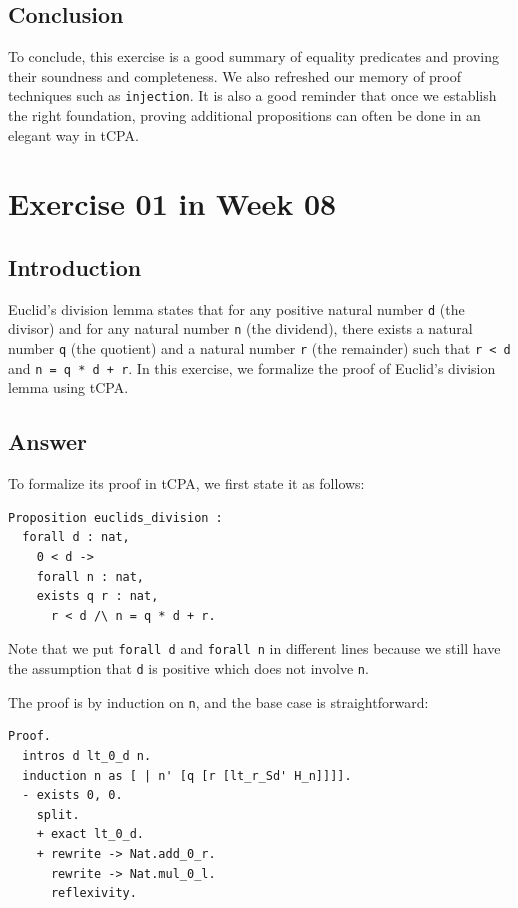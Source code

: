 \documentclass{article}
\begin{document}
\subsection{Conclusion}
To conclude, this exercise is a good summary of equality predicates and proving their soundness and completeness. We also refreshed our memory of proof techniques such as \texttt{injection}. It is also a good reminder that once we establish the right foundation, proving additional propositions can often be done in an elegant way in tCPA.

\newpage

\section{Exercise 01 in Week 08}

\subsection{Introduction}
Euclid's division lemma states that for any positive natural number \texttt{d} (the divisor) and for any natural number \texttt{n} (the dividend), there exists a natural number \texttt{q} (the quotient) and a natural number \texttt{r} (the remainder) such that \texttt{r < d} and \texttt{n = q * d + r}. In this exercise, we formalize the proof of Euclid's division lemma using tCPA. 

\subsection{Answer}
To formalize its proof in tCPA, we first state it as follows:
\begin{lstlisting}
Proposition euclids_division :
  forall d : nat,
    0 < d ->
    forall n : nat,
    exists q r : nat,
      r < d /\ n = q * d + r.
\end{lstlisting}

Note that we put \texttt{forall d} and \texttt{forall n} in different lines because we still have the assumption that \texttt{d} is positive which does not involve \texttt{n}. 

The proof is by induction on \texttt{n}, and the base case is straightforward:
\begin{lstlisting}
Proof.
  intros d lt_0_d n.
  induction n as [ | n' [q [r [lt_r_Sd' H_n]]]].
  - exists 0, 0.
    split.
    + exact lt_0_d.
    + rewrite -> Nat.add_0_r.
      rewrite -> Nat.mul_0_l.
      reflexivity.
\end{lstlisting}
\end{document}
